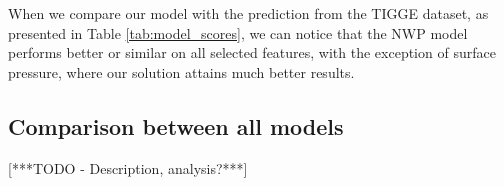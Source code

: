 When we compare our model with the prediction from the TIGGE dataset, as presented in Table \ref{tab:model_scores}, we can notice that the NWP model performs better or similar on all selected features, with the exception of surface pressure, where our solution attains much better results.

\subsection{Comparison between all models}
[***TODO - Description, analysis?***]



